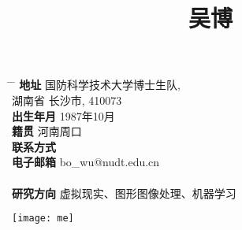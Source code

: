 \documentclass[20pt]{article} %
\begin{document}

\title{吴博} %
\begin{minipage}{0.5\textwidth}
\centering
\begin{tabbing}%
\hspace{3cm} \= \hspace{4cm} \= \kill %
{\bf 地址} \> 国防科学技术大学博士生队,\\%
\> 湖南省 长沙市, 410073 \\%
{\bf 出生年月} \> 1987年10月 \\ %
{\bf 籍贯} \> 河南周口 \\%
{\bf 联系方式}  \\ %
{\bf 电子邮箱} \> bo_wu@nudt.edu.cn \\ \\%
{\bf 研究方向} \> 虚拟现实、图形图像处理、机器学习 \\ %
\end{tabbing}%
\end{minipage}
\begin{minipage}{0.5\textwidth}
\hspace{3cm}
  \texttt{[image: me]}\\
\end{minipage}
\end{document}
